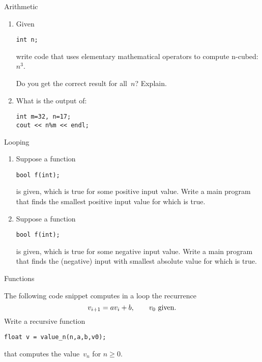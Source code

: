 

 {Arithmetic}

\begin{enumerate}
\item
  Given
\begin{verbatim}
int n;
\end{verbatim}
write code that
uses elementary mathematical operators to compute n-cubed: $n^3$.

Do you get the correct result for all~$n$? Explain.
\item What is the output of:
\begin{verbatim}
int m=32, n=17;
cout << n%m << endl;
\end{verbatim}
\end{enumerate}

 {Looping}

\begin{enumerate}
\item Suppose a function
\begin{verbatim}
bool f(int);
\end{verbatim}
is given, which is true for some positive input value. Write a main program that
finds the smallest positive input value for which  is true.
\item Suppose a function
\begin{verbatim}
bool f(int);
\end{verbatim}
is given, which is true for some negative input value. Write a main program that
finds the (negative) input with smallest absolute value for which  is true.
\end{enumerate}

 {Functions}

\begin{exercise}
  \label{ex:iter-recurrence}
  The following code snippet computes in a loop the recurrence
  \[ v_{i+1} = av_i+b,\qquad \hbox{$v_0$ given.} \]
  Write a recursive function
\begin{lstlisting}
float v = value_n(n,a,b,v0);
\end{lstlisting}
  that computes the value~$v_n$ for $n\geq0$.
\end{exercise}

